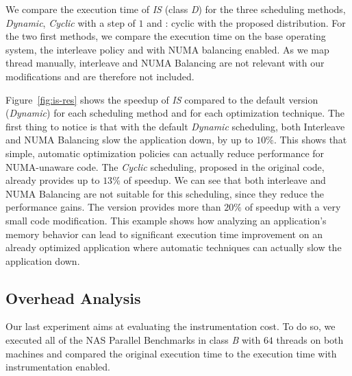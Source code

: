 We compare the execution time of \emph{IS} (class \emph{D}) for the three scheduling
methods, \emph{Dynamic}, \emph{Cyclic} with a step of $1$ and \TABARNAC:
cyclic with the proposed distribution. For the two first methods, we compare the
execution time on the base operating system, the interleave policy and with
NUMA balancing enabled. As we map thread manually, interleave and NUMA
Balancing are not relevant with our modifications and are therefore not included.


Figure~\ref{fig:is-res} shows the speedup of \emph{IS} compared to
the default version (\emph{Dynamic}) for each scheduling method and for each
optimization technique. The first thing to notice is that with the default
\emph{Dynamic} scheduling, both Interleave and NUMA Balancing slow
the application down, by up to $10\%$. This shows that simple, automatic optimization policies can actually reduce performance
for NUMA-unaware code.
The \emph{Cyclic} scheduling, proposed in the original code, already provides up to $13\%$ of
speedup. We can see that both interleave and NUMA Balancing are not suitable
for this scheduling, since they reduce the performance gains.
The \TABARNAC version provides more than $20\%$ of speedup with a very small code
modification.
This example shows how analyzing an application's memory behavior can lead to
significant execution time improvement on an already optimized application where automatic techniques can actually slow
the application down.

\subsection{Overhead Analysis}
\label{sec:expe-overhead}

Our last experiment aims at evaluating the instrumentation cost. To do so, we
executed all of the NAS Parallel Benchmarks in class \emph{B} with $64$
threads on both machines and compared the original execution time to the execution time with instrumentation enabled.



